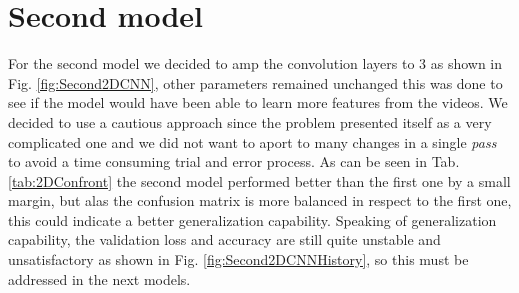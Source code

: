 \section{Second model}
For the second model we decided to amp the convolution layers to 3 as shown in Fig. \ref{fig:Second2DCNN}, other parameters remained unchanged this was done to see if the model would have been able to learn more features from the videos. 
We decided to use a cautious approach since the problem presented itself as a very complicated one and we did not want to aport to many changes in a single \textit{pass} to avoid a time consuming trial and error process. As can be seen in Tab. \ref{tab:2DConfront} the second model performed better than the first one by a small margin, but alas the confusion matrix is more balanced in respect to the first one, this could indicate a better generalization capability. Speaking of generalization capability, the validation loss and accuracy are still quite unstable and unsatisfactory as shown in Fig. \ref*{fig:Second2DCNNHistory}, so this must be addressed in the next models.
\begin{table}[H]
    \centering
    \caption{Confront between the two models}
    \label{tab:2DConfront}
    \end{table}

